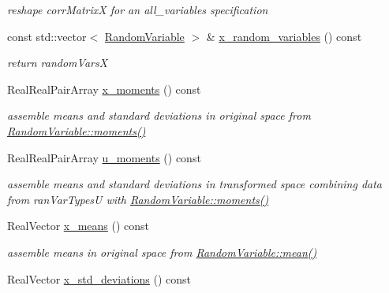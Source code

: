 \begin{DoxyCompactItemize}
\begin{DoxyCompactList}\small\item\em reshape corr\+MatrixX for an all\+\_\+variables specification \end{DoxyCompactList}\item 
const std\+::vector$<$ \hyperlink{classPecos_1_1RandomVariable}{Random\+Variable} $>$ \& \hyperlink{classPecos_1_1ProbabilityTransformation_a8cf419a8b9b80ede75847982ca1cb2f2}{x\+\_\+random\+\_\+variables} () const \label{classPecos_1_1ProbabilityTransformation_a8cf419a8b9b80ede75847982ca1cb2f2}

\begin{DoxyCompactList}\small\item\em return random\+VarsX \end{DoxyCompactList}\item 
Real\+Real\+Pair\+Array \hyperlink{classPecos_1_1ProbabilityTransformation_a6e23250fe253071b0fd41332ac9dd659}{x\+\_\+moments} () const \label{classPecos_1_1ProbabilityTransformation_a6e23250fe253071b0fd41332ac9dd659}

\begin{DoxyCompactList}\small\item\em assemble means and standard deviations in original space from \hyperlink{classPecos_1_1RandomVariable_a80e9024c98c6105a5eace8601a91b3d3}{Random\+Variable\+::moments()} \end{DoxyCompactList}\item 
Real\+Real\+Pair\+Array \hyperlink{classPecos_1_1ProbabilityTransformation_a98a9bf9927cebb911f39c6fe8f05430a}{u\+\_\+moments} () const \label{classPecos_1_1ProbabilityTransformation_a98a9bf9927cebb911f39c6fe8f05430a}

\begin{DoxyCompactList}\small\item\em assemble means and standard deviations in transformed space combining data from ran\+Var\+TypesU with \hyperlink{classPecos_1_1RandomVariable_a80e9024c98c6105a5eace8601a91b3d3}{Random\+Variable\+::moments()} \end{DoxyCompactList}\item 
Real\+Vector \hyperlink{classPecos_1_1ProbabilityTransformation_a398cbff559c5f84cc1abcfcd1cf5bc4a}{x\+\_\+means} () const \label{classPecos_1_1ProbabilityTransformation_a398cbff559c5f84cc1abcfcd1cf5bc4a}

\begin{DoxyCompactList}\small\item\em assemble means in original space from \hyperlink{classPecos_1_1RandomVariable_a962ffe5a3593be370d5c883365c060f4}{Random\+Variable\+::mean()} \end{DoxyCompactList}\item 
Real\+Vector \hyperlink{classPecos_1_1ProbabilityTransformation_a5285a016007b33b9d27b3eb29a00637e}{x\+\_\+std\+\_\+deviations} () const \label{classPecos_1_1ProbabilityTransformation_a5285a016007b33b9d27b3eb29a00637e}


\end{DoxyCompactItemize}
